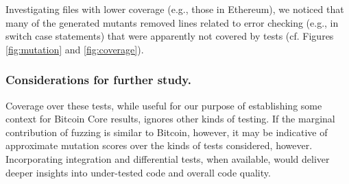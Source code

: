 %
%

%

Investigating files with lower coverage (e.g., those in Ethereum), we noticed
that many of the generated mutants removed lines related to error checking
(e.g., in switch case statements) that were apparently not covered by tests (cf.
Figures \ref{fig:mutation} and \ref{fig:coverage}).

%

\subsubsection*{Considerations for further study.}

Coverage over these tests, while useful for our purpose of
establishing some context for Bitcoin Core results, ignores
other kinds of testing. If the marginal contribution of fuzzing is
similar to Bitcoin, however, it may be indicative of approximate
mutation scores over the kinds of tests considered, however.
Incorporating integration and differential tests, when available, would deliver deeper insights into under-tested code and overall code quality.


